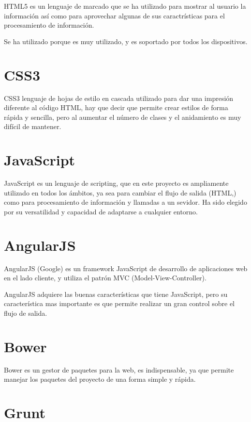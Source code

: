 HTML5 es un lenguaje de marcado que se ha utilizado para mostrar al usuario la información así como para aprovechar algunas de sus caractrísticas para el procesamiento de información.

Se ha utilizado porque es muy utilizado, y es soportado por todos los dispositivos.

\section{CSS3}\label{CSS3}

CSS3 lenguaje de hojas de estilo en cascada utilizado para dar una impresión diferente al código HTML, hay que decir que permite crear estilos de forma rápida y sencilla, pero al aumentar el número de clases y el anidamiento es muy difícil de mantener. 

\section{JavaScript}\label{JavaScript}

JavaScript es un lenguaje de scripting, que en este proyecto es ampliamente utilizado en todos los ámbitos, ya sea para cambiar el flujo de salida (HTML,) como para procesamiento de información y llamadas a un sevidor. Ha sido elegido por su versatilidad y capacidad de adaptarse a cualquier entorno.

\section{AngularJS}\label{AngularJS}

AngularJS (Google) es un framework JavaScript de desarrollo de aplicaciones web en el lado cliente, y utiliza el patrón MVC (Model-View-Controller).

AngularJS adquiere las buenas características que tiene JavaScript, pero su característica mas importante es que permite realizar un gran control sobre el flujo de salida.

\section{Bower}\label{Bower}

Bower es un gestor de paquetes para la web, es indispensable, ya que permite manejar los paquetes del proyecto de una forma simple y rápida.

\section{Grunt}\label{Grunt}

